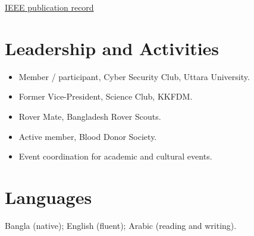 \documentclass[10pt,a4paper]{article}
\begin{document}
\href{https://doi.org/10.1109/iccit68739.2025.11490554}{IEEE publication record}

\section*{Leadership and Activities}
\begin{itemize}
  \item Member / participant, Cyber Security Club, Uttara University.
  \item Former Vice-President, Science Club, KKFDM.
  \item Rover Mate, Bangladesh Rover Scouts.
  \item Active member, Blood Donor Society.
  \item Event coordination for academic and cultural events.
\end{itemize}

\section*{Languages}
Bangla (native); English (fluent); Arabic (reading and writing).
\end{document}
